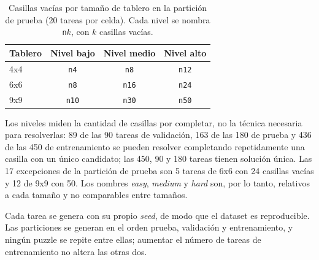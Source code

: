 \begin{table}[htbp]
  \centering\small
  \caption{Casillas vacías por tamaño de tablero en la partición de prueba
  (20 tareas por celda). Cada nivel se nombra \texttt{n$k$}, con $k$ casillas
  vacías.}
  \label{tab:niveles_prueba}
  \begin{tabular}{@{}lccc@{}}
    \toprule
    Tablero & Nivel bajo & Nivel medio & Nivel alto \\
    \midrule
    4x4 & \texttt{n4}  & \texttt{n8}  & \texttt{n12} \\
    6x6 & \texttt{n8}  & \texttt{n16} & \texttt{n24} \\
    9x9 & \texttt{n10} & \texttt{n30} & \texttt{n50} \\
    \bottomrule
  \end{tabular}
\end{table}

Los niveles miden la cantidad de casillas por completar, no la técnica
necesaria para resolverlas: 89 de las 90 tareas de validación, 163 de las 180
de prueba y 436 de las 450 de entrenamiento se pueden resolver completando
repetidamente una casilla con un único candidato; las 450, 90 y 180 tareas tienen solución
única. Las 17 excepciones de la partición de prueba son 5 tareas de 6x6 con 24
casillas vacías y 12 de 9x9 con 50. Los nombres \emph{easy}, \emph{medium} y
\emph{hard} son, por lo tanto, relativos a cada tamaño y no comparables entre
tamaños.

Cada tarea se genera con su propio \emph{seed}, de modo que el dataset es
reproducible. Las particiones se generan en el orden prueba, validación
y entrenamiento, y ningún puzzle se repite entre ellas; aumentar el
número de tareas de entrenamiento no altera las otras dos.
